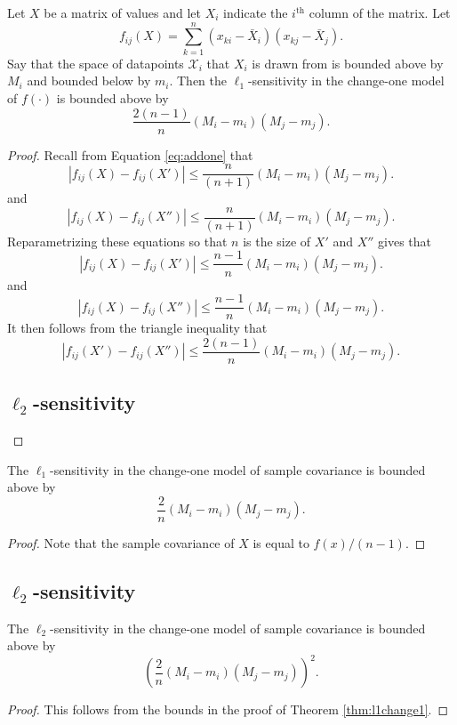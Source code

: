 \documentclass[11pt]{scrartcl} %
\begin{document}
\begin{theorem}
\label{thm:l1change1}
Let $X$ be a matrix of values and let $X_i$ indicate the $i^{\text{th}}$ column of the matrix. Let
$$ f_{ij} (X)= \sum_{k=1}^n (x_{ki} - \bar{X}_i)(x_{kj} - \bar{X}_j).$$
Say that the space of datapoints $\mathcal{X}_i$ that $X_i$ is drawn from is bounded above by $M_i$ and bounded below by $m_i$. Then the $\ell_1$-sensitivity in the change-one model of $f(\cdot)$ is bounded above by
$$ \frac{2(n-1)}{n}  (M_i - m_i)(M_j - m_j).$$
\end{theorem}

\begin{proof}
Recall from Equation \ref{eq:addone} that 
$$ \left\vert f_{ij}(X) - f_{ij}(X') \right\vert \le \frac{n}{(n+1)}  (M_i - m_i)(M_j - m_j).$$
and
$$ \left\vert f_{ij}(X) - f_{ij}(X'') \right\vert \le \frac{n}{(n+1)}  (M_i - m_i)(M_j - m_j).$$
Reparametrizing these equations so that $n$ is the size of $X'$ and $X''$ gives that 
$$ \left\vert f_{ij}(X) - f_{ij}(X') \right\vert \le \frac{n-1}{n}  (M_i - m_i)(M_j - m_j).$$
and
$$ \left\vert f_{ij}(X) - f_{ij}(X'') \right\vert \le \frac{n-1}{n}  (M_i - m_i)(M_j - m_j).$$
It then follows from the triangle inequality that 
$$ \left\vert f_{ij}(X') - f_{ij}(X'') \right\vert \le \frac{2(n-1)}{n}  (M_i - m_i)(M_j - m_j).$$
\subsection{$\ell_2$-sensitivity}
\end{proof}

\begin{corollary}
The $\ell_1$-sensitivity in the change-one model of sample covariance is bounded above by
$$\frac{2}{n}  (M_i - m_i)(M_j - m_j).$$
\end{corollary}

\begin{proof}
Note that the sample covariance of $X$ is equal to $f(x)/(n-1)$.
\end{proof}

\subsection{$\ell_2$-sensitivity}

\begin{theorem}
The $\ell_2$-sensitivity in the change-one model of sample covariance is bounded above by 
$$\left(\frac{2}{n}  (M_i - m_i)(M_j - m_j)\right)^2.$$
\end{theorem}

\begin{proof}
This follows from the bounds in the proof of Theorem \ref{thm:l1change1}.
\end{proof}



\end{document}
